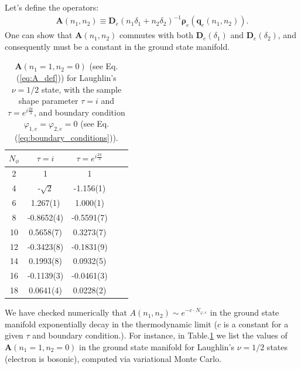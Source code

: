 \begin{subappendices}
Let's define the operators:
\begin{align}
\mathbf A(n_1,n_2)\equiv \pmb{\bm D}_e(n_1\delta_1+n_2\delta_2)^{-1} \pmb{\boldsymbol\rho}_e(\mathbf q_e(n_1,n_2)).\label{eq:A_def}
\end{align}
One can show that $\mathbf A(n_1,n_2)$ commutes with both $\pmb{\bm D}_e(\delta_1)$ and $\pmb{\bm D}_e(\delta_2)$, and consequently must be a constant in the ground state manifold.


\begin{table}
\centering
\vspace{2mm}
\begin{tabular}{||c | c | c | c | c||} 
 \hline
 $N_\phi$ & $\tau=i$ & $\tau=e^{i\frac{2\pi}{3}}$ \\ 
 \hline\hline
 2 & 1  & 1 \\\hline
 4 & -$\sqrt{2}$ & -1.156(1)\\\hline
 6 & 1.267(1) & 1.000(1) \\\hline
 8 & -0.8652(4) & -0.5591(7) \\\hline
 10 & 0.5658(7)& 0.3273(7) \\\hline
 12 & -0.3423(8) & -0.1831(9)\\\hline
 14 & 0.1993(8) & 0.0932(5) \\\hline
 16 & -0.1139(3) &  -0.0461(3)\\\hline
 18 & 0.0641(4) & 0.0228(2)\\\hline
 \hline
\end{tabular}
\caption{$\mathbf A(n_1=1,n_2=0)$ (see Eq.(\ref{eq:A_def})) for Laughlin's $\nu=1/2$ state, with the sample shape parameter $\tau=i$ and $\tau=e^{i\frac{2\pi}{3}}$, and boundary condition $\varphi_{1,e}=\varphi_{2,e}=0$ (see Eq.(\ref{eq:boundary_conditions})).}
\label{tb:rho_v_expectation}
\end{table}

We have checked numerically that $A(n_1,n_2)\sim e^{-c \cdot N_{\varphi,e}}$ in the ground state manifold exponentially decay in the thermodynamic limit ($c$ is a constant for a given $\tau$ and boundary condition.). For instance, in Table.\ref{tb:rho_v_expectation} we list the values of $\mathbf A(n_1=1,n_2=0)$ in the ground state manifold for Laughlin's $\nu=1/2$ states (electron is bosonic), computed via variational Monte Carlo.


\end{subappendices}
